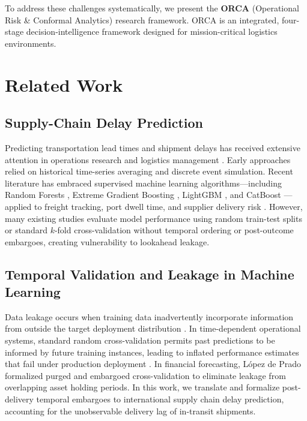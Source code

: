 \documentclass[11pt,a4paper]{article}
\begin{document}
To address these challenges systematically, we present the \textbf{ORCA} (Operational Risk \& Conformal Analytics) research framework. ORCA is an integrated, four-stage decision-intelligence framework designed for mission-critical logistics environments.

\section{Related Work}
\subsection{Supply-Chain Delay Prediction}
Predicting transportation lead times and shipment delays has received extensive attention in operations research and logistics management \cite{baryannis2019supply}. Early approaches relied on historical time-series averaging and discrete event simulation. Recent literature has embraced supervised machine learning algorithms---including Random Forests \cite{breiman2001random}, Extreme Gradient Boosting \cite{chen2016xgboost}, LightGBM \cite{ke2017lightgbm}, and CatBoost \cite{prokhorenkova2018catboost}---applied to freight tracking, port dwell time, and supplier delivery risk \cite{baryannis2019supply, chawla2002smote}. However, many existing studies evaluate model performance using random train-test splits or standard $k$-fold cross-validation without temporal ordering or post-outcome embargoes, creating vulnerability to lookahead leakage.

\subsection{Temporal Validation and Leakage in Machine Learning}
Data leakage occurs when training data inadvertently incorporate information from outside the target deployment distribution \cite{kapoor2023leakage}. In time-dependent operational systems, standard random cross-validation permits past predictions to be informed by future training instances, leading to inflated performance estimates that fail under production deployment \cite{roberts2017crossvalidation, bergmeir2012use}. In financial forecasting, López de Prado \cite{deprado2018advances} formalized purged and embargoed cross-validation to eliminate leakage from overlapping asset holding periods. In this work, we translate and formalize post-delivery temporal embargoes to international supply chain delay prediction, accounting for the unobservable delivery lag of in-transit shipments.
\end{document}

